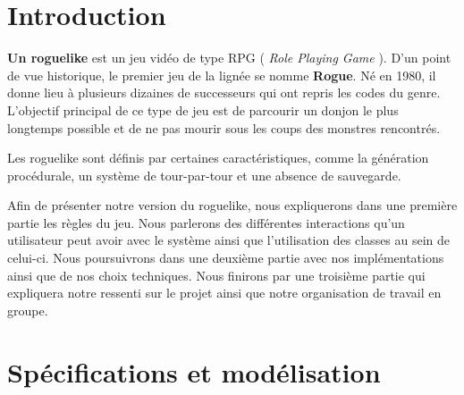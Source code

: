 \documentclass[a4paper, 12pt, twoside]{article}
\begin{document}
\section*{Introduction}
\textbf{Un roguelike} est un jeu vidéo de type RPG ( \textit{Role Playing Game} ). D'un point de vue historique, le premier jeu de la lignée se nomme \textbf{Rogue}. Né en 1980, il donne lieu à plusieurs dizaines de successeurs qui ont repris les codes du genre. L'objectif principal de ce type de jeu est de parcourir un donjon le plus longtemps possible et de ne pas mourir sous les coups des monstres rencontrés.\par
Les roguelike sont définis par certaines caractéristiques, comme la génération procédurale, un système de tour-par-tour et une absence de sauvegarde.\par
Afin de présenter notre version du roguelike, nous expliquerons dans une première partie les règles du jeu. Nous parlerons des différentes interactions qu'un utilisateur peut avoir avec le système ainsi que l'utilisation des classes au sein de celui-ci. Nous poursuivrons dans une deuxième partie avec nos implémentations ainsi que de nos choix techniques. Nous finirons par une troisième partie qui expliquera notre ressenti sur le projet ainsi que notre organisation de travail en groupe. 
\newpage
\tableofcontents
\newpage
\section{Spécifications et modélisation}
\end{document}
